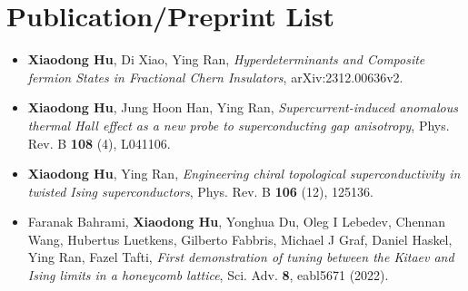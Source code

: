 \chapter*{Publication/Preprint List}
\begin{itemize}
    \item \textbf{Xiaodong Hu}, Di Xiao, Ying Ran, \emph{Hyperdeterminants and Composite fermion States in Fractional Chern Insulators}, {\color{url}arXiv:2312.00636v2}.
    \item \textbf{Xiaodong Hu}, Jung Hoon Han, Ying Ran, \emph{Supercurrent-induced anomalous thermal Hall effect as a new probe to superconducting gap anisotropy}, {\color{url}Phys. Rev. B \textbf{108} (4), L041106}.
    \item \textbf{Xiaodong Hu}, Ying Ran, \emph{Engineering chiral topological superconductivity in twisted Ising superconductors}, {\color{url}Phys. Rev. B \textbf{106} (12), 125136}.
    \item Faranak Bahrami, \textbf{Xiaodong Hu}, Yonghua Du, Oleg I Lebedev, Chennan Wang, Hubertus Luetkens, Gilberto Fabbris, Michael J Graf, Daniel Haskel, Ying Ran, Fazel Tafti, \emph{First demonstration of tuning between the Kitaev and Ising limits in a honeycomb lattice}, {\color{url}Sci. Adv. \textbf{8}, eabl5671 (2022)}.
\end{itemize}